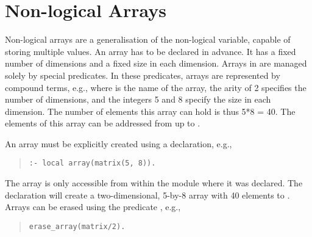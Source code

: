 \section{Non-logical Arrays}
Non-logical arrays are a generalisation of the non-logical variable, capable of
storing
multiple values.
An array has to be declared in advance.
It has a fixed number of dimensions and a fixed size in each dimension.
Arrays in {\eclipse} are managed solely by special predicates.
In these predicates, arrays are represented by compound terms, e.g.,
where  is the name of the array, the arity of 2 specifies
the number of dimensions, and the integers 5 and 8 specify the size
in each dimension. The number of elements this array can hold is
thus 5*8 = 40.
The elements of this array can be addressed from 
up to .

An array must be explicitly created using a
declaration, e.g.,
\begin{quote}
\begin{verbatim}
:- local array(matrix(5, 8)).
\end{verbatim}
\end{quote}
The array is only accessible from within the module where it was declared.
The declaration will create a two-dimensional, 5-by-8 array with 40 elements
 to .
Arrays can be  erased using the predicate
,
e.g.,
\begin{quote}
\begin{verbatim}
erase_array(matrix/2).
\end{verbatim}
\end{quote}

